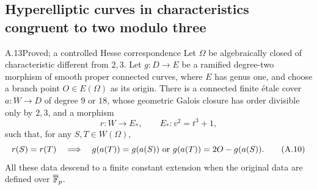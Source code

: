 \subsection{Hyperelliptic curves in characteristics congruent to two modulo three}

\begin{claim}{A.13}{Proved; a controlled Hesse correspondence}
Let $\Omega$ be algebraically closed of characteristic different
from $2,3$. Let $g:D\to E$ be a ramified degree-two morphism
of smooth proper connected curves, where $E$ has genus one,
and choose a branch point $O\in E(\Omega)$ as its origin.
There is a connected finite \'etale cover $a:W\to D$ of
degree $9$ or $18$, whose geometric Galois closure has order
divisible only by $2,3$, and a morphism
\[
 r:W\longrightarrow E_* ,\qquad E_*:v^2=t^3+1,
\]
such that, for any $S,T\in W(\Omega)$,
\[
 r(S)=r(T)\quad\Longrightarrow\quad
 g(a(T))=g(a(S))\ \hbox{or}\ g(a(T))=2O-g(a(S)).                 \tag{A.10}
\]
All these data descend to a finite constant extension when the
original data are defined over $\overline{\mathbb F}_p$.
\end{claim}
